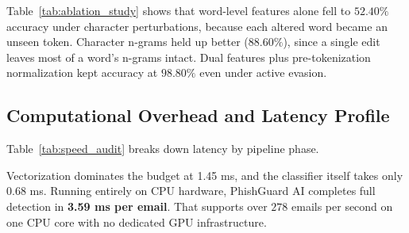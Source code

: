\documentclass[conference]{IEEEtran}
\begin{document}
Table~\ref{tab:ablation_study} shows that word-level features alone fell to $52.40\%$ accuracy under character perturbations, because each altered word became an unseen token. Character n-grams held up better ($88.60\%$), since a single edit leaves most of a word's n-grams intact. Dual features plus pre-tokenization normalization kept accuracy at $98.80\%$ even under active evasion.

\subsection{Computational Overhead and Latency Profile}
Table~\ref{tab:speed_audit} breaks down latency by pipeline phase.

\begin{table}[!t]
\caption{Computational Overhead and Inference Latency Profile.}
\label{tab:speed_audit}
\centering\footnotesize
{}
\end{table}

Vectorization dominates the budget at 1.45 ms, and the classifier itself takes only 0.68 ms. Running entirely on CPU hardware, PhishGuard AI completes full detection in \textbf{3.59 ms per email}. That supports over $278$ emails per second on one CPU core with no dedicated GPU infrastructure.

\end{document}
